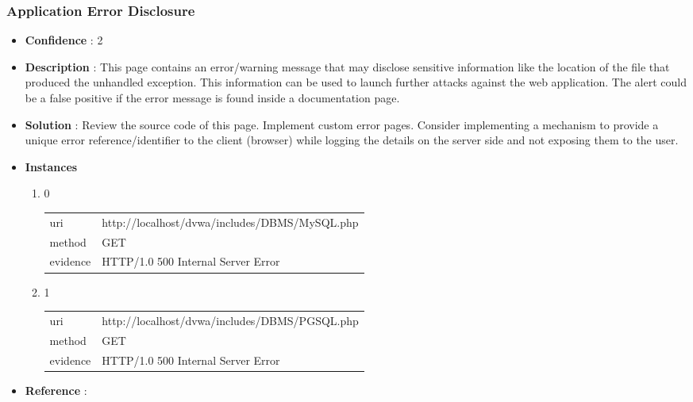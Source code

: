 \documentclass[10pt]{article}
\begin{document}
\subsubsection{Application Error Disclosure}
\begin{itemize}
\item[] \textbf{Confidence} : 2
\item[] \textbf{Description} : This page contains an error/warning message that may disclose sensitive information like the location of the file that produced the unhandled exception. This information can be used to launch further attacks against the web application. The alert could be a false positive if the error message is found inside a documentation page.
\item[] \textbf{Solution} :  Review the source code of this page. Implement custom error pages. Consider implementing a mechanism to provide a unique error reference/identifier to the client (browser) while logging the details on the server side and not exposing them to the user.
\item[] \textbf{Instances}
\begin{enumerate}
\item[] 0
\begin{tabular}{| l | p{12cm}}
uri & http://localhost/dvwa/includes/DBMS/MySQL.php \\
method & GET \\
evidence & HTTP/1.0 500 Internal Server Error \\
\end{tabular}
\item[] 1
\begin{tabular}{| l | p{12cm}}
uri & http://localhost/dvwa/includes/DBMS/PGSQL.php \\
method & GET \\
evidence & HTTP/1.0 500 Internal Server Error \\
\end{tabular}
\end{enumerate}
\item[] \textbf{Reference} : 
\end{itemize}
\end{document}
